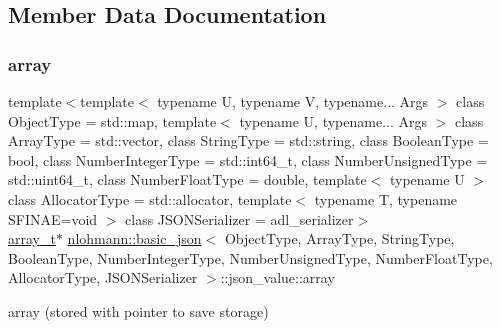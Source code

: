 \subsection{Member Data Documentation}
\mbox{\label{unionnlohmann_1_1basic__json_1_1json__value_a7947687f3ae1911d6e9847e2b3226157}} 
\subsubsection{\texorpdfstring{array}{array}}
{\footnotesize\ttfamily template$<$template$<$ typename U, typename V, typename... Args $>$ class Object\+Type = std\+::map, template$<$ typename U, typename... Args $>$ class Array\+Type = std\+::vector, class String\+Type  = std\+::string, class Boolean\+Type  = bool, class Number\+Integer\+Type  = std\+::int64\+\_\+t, class Number\+Unsigned\+Type  = std\+::uint64\+\_\+t, class Number\+Float\+Type  = double, template$<$ typename U $>$ class Allocator\+Type = std\+::allocator, template$<$ typename T, typename S\+F\+I\+N\+A\+E=void $>$ class J\+S\+O\+N\+Serializer = adl\+\_\+serializer$>$ \\
\mbox{\hyperlink{classnlohmann_1_1basic__json_ae095578e03df97c5b3991787f1056374}{array\+\_\+t}}$\ast$ \mbox{\hyperlink{classnlohmann_1_1basic__json}{nlohmann\+::basic\+\_\+json}}$<$ Object\+Type, Array\+Type, String\+Type, Boolean\+Type, Number\+Integer\+Type, Number\+Unsigned\+Type, Number\+Float\+Type, Allocator\+Type, J\+S\+O\+N\+Serializer $>$\+::json\+\_\+value\+::array}



array (stored with pointer to save storage) 

